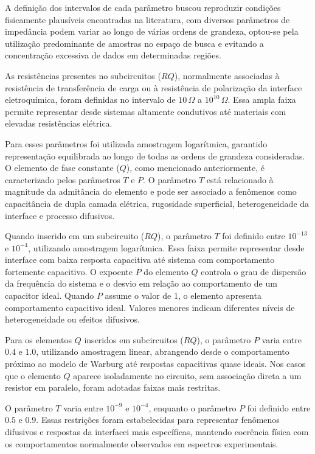 A definição dos intervalos de cada parâmetro buscou reproduzir condições
fisicamente plausíveis encontradas na literatura, com diversos parâmetros de impedância
podem variar ao longo de várias ordens de grandeza, optou-se pela utilização predominante de
amostras no espaço de busca e evitando a concentração excessiva de dados em determinadas
regiões. 

As resistências presentes no subcircuitos ($RQ$), normalmente associadas à resistência
de transferência de carga ou à resistência de polarização da interface eletroquímica, foram
definidas no intervalo de $10\,\Omega$ a $10^{10}\,\Omega$. Essa ampla faixa permite representar desde sistemas
altamente condutivos até materiais com elevadas resistências elétrica.

Para esses parâmetros foi
utilizada amostragem logarítmica, garantido representação equilibrada ao longo de todas as
ordens de grandeza consideradas. O elemento de fase constante ($Q$), como mencionado
anteriormente, é caracterizado pelos parâmetros $T$ e $P$. O parâmetro $T$ está relacionado à
magnitude da admitância do elemento e pode ser associado a fenômenos como capacitância de dupla camada elétrica, rugosidade superficial, heterogeneidade da interface e processo
difusivos.

Quando inserido em um subcircuito ($RQ$), o parâmetro $T$ foi definido entre $10^{-13}$ e $10^{-4}$, utilizando amostragem logarítmica. Essa faixa permite representar desde interface com baixa resposta capacitiva até sistema com comportamento fortemente capacitivo. O expoente $P$ do elemento $Q$ controla o grau de dispersão da frequência do sistema e o desvio em relação ao comportamento de um capacitor ideal. Quando $P$ assume o valor de 1, o elemento apresenta comportamento capacitivo ideal. 
Valores menores indicam diferentes níveis de
heterogeneidade ou efeitos difusivos.

Para os elementos $Q$ inseridos em subcircuitos ($RQ$), o
parâmetro $P$ varia entre $0.4$ e $1.0$, utilizando amostragem linear, abrangendo desde o
comportamento próximo ao modelo de Warburg até respostas capacitivas quase ideais. Nos
casos que o elemento $Q$ aparece isoladamente no circuito, sem associação direta a um resistor
em paralelo, foram adotadas faixas mais restritas.

O parâmetro $T$ varia entre \(10^{-9}\) e $10^{-4}$,
enquanto o parâmetro $P$ foi definido entre $0.5$ e $0.9$. Essas restrições foram estabelecidas para
representar fenômenos difusivos e respostas da interfacei mais específicas, mantendo coerência
física com os comportamentos normalmente observados em espectros experimentais.

